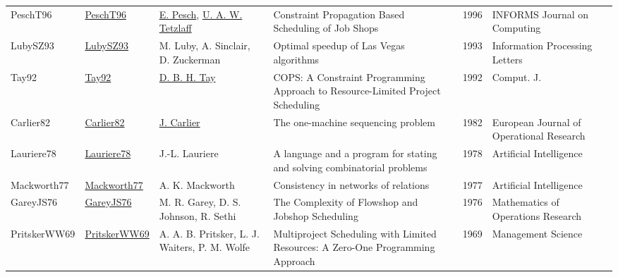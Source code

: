 {\begin{longtable}{p{2cm}p{2cm}p{5cm}p{10cm}rp{3cm}l}
PeschT96 & \href{http://dx.doi.org/10.1287/ijoc.8.2.144}{PeschT96} & \hyperref[auth:a438]{E. Pesch}, \hyperref[auth:a1217]{U. A. W. Tetzlaff} & Constraint Propagation Based Scheduling of Job Shops & 1996 & \cellcolor{red!20}INFORMS Journal on Computing & \cite{PeschT96}\\
LubySZ93 & \href{http://dx.doi.org/10.1016/0020-0190(93)90029-9}{LubySZ93} & M. Luby, A. Sinclair, D. Zuckerman & Optimal speedup of Las Vegas algorithms & 1993 & Information Processing Letters & \cite{LubySZ93}\\
Tay92 & \href{}{Tay92} & \hyperref[auth:a701]{D. B. H. Tay} & {COPS:} {A} Constraint Programming Approach to Resource-Limited Project Scheduling & 1992 & Comput. J. & \cite{Tay92}\\
Carlier82 & \href{http://dx.doi.org/10.1016/s0377-2217(82)80007-6}{Carlier82} & \hyperref[auth:a845]{J. Carlier} & The one-machine sequencing problem & 1982 & European Journal of Operational Research & \cite{Carlier82}\\
Lauriere78 & \href{http://dx.doi.org/10.1016/0004-3702(78)90029-2}{Lauriere78} & J.-L. Lauriere & A language and a program for stating and solving combinatorial problems & 1978 & Artificial Intelligence & \cite{Lauriere78}\\
Mackworth77 & \href{http://dx.doi.org/10.1016/0004-3702(77)90007-8}{Mackworth77} & A. K. Mackworth & Consistency in networks of relations & 1977 & Artificial Intelligence & \cite{Mackworth77}\\
GareyJS76 & \href{http://dx.doi.org/10.1287/moor.1.2.117}{GareyJS76} & M. R. Garey, D. S. Johnson, R. Sethi & The Complexity of Flowshop and Jobshop Scheduling & 1976 & Mathematics of Operations Research & \cite{GareyJS76}\\
PritskerWW69 & \href{http://dx.doi.org/10.1287/mnsc.16.1.93}{PritskerWW69} & A. A. B. Pritsker, L. J. Waiters, P. M. Wolfe & Multiproject Scheduling with Limited Resources: A Zero-One Programming Approach & 1969 & Management Science & \cite{PritskerWW69}\\
\end{longtable}
}

